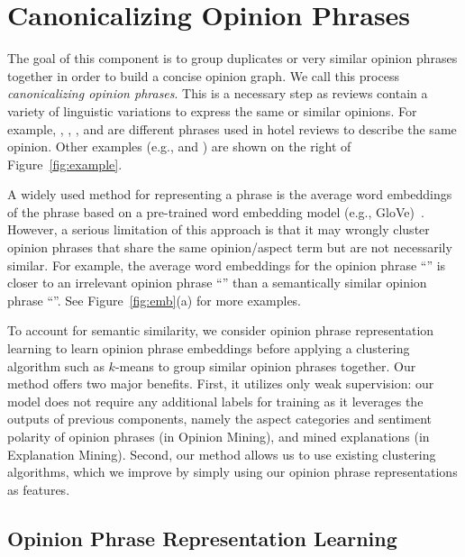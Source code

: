 \section{Canonicalizing Opinion Phrases}\label{sec:cluster}


The goal of this component is to group duplicates or very similar opinion phrases together in order to build a concise opinion graph. We call this process {\em canonicalizing opinion phrases}. This is a necessary step as reviews contain 
a variety of linguistic variations to express the same or similar opinions. 
For example, , , , and  are different phrases used in hotel reviews to describe the same opinion. Other examples (e.g.,  and ) are shown on the right of Figure~\ref{fig:example}.

A widely used method for representing a phrase is the average word embeddings of the phrase based on a pre-trained word embedding model (e.g., GloVe)~\cite{kusner2015word, Vahishth:2018:CESI}.%
However, a serious limitation of this approach is that it may wrongly cluster opinion phrases that share the same opinion/aspect term but are not necessarily similar. For example, the average word embeddings for the opinion phrase ``'' is closer to an irrelevant opinion phrase ``'' than a semantically similar opinion phrase ``''. See Figure~\ref{fig:emb}(a) for more examples. 



To account for semantic similarity, we consider opinion phrase representation learning to learn opinion phrase embeddings before applying
a clustering algorithm such as $k$-means to group similar opinion phrases together. Our method offers 
two major benefits. First, it utilizes only weak supervision: our model does not require any additional labels for training as it leverages the outputs of previous components, namely the aspect categories and sentiment polarity of opinion phrases (in Opinion Mining), and mined explanations (in Explanation Mining). Second, our method allows us to use existing clustering algorithms, which we improve by simply using our opinion phrase representations as features.

\subsection{Opinion Phrase Representation Learning}

